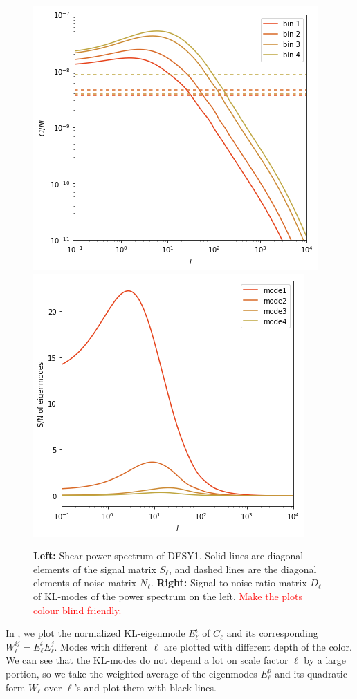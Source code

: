 \documentclass[twocolumn]{\docclass}
\begin{document}
	\begin{figure}
		\includegraphics[width=0.7\columnwidth]{Cl_pst.png}
		\qquad \qquad \qquad
		\includegraphics[width=0.7\columnwidth]{Dl_pst.png}
		\caption{\textbf{Left:} Shear power spectrum of DESY1. Solid lines are diagonal elements of the signal matrix $S_{\ell}$, and dashed lines are the diagonal elements of noise matrix $N_{\ell}$. \textbf{Right:} Signal to noise ratio matrix $D_\ell$ of KL-modes of the power spectrum on the left. \textcolor{red}{Make the plots colour blind friendly.} \label{fig:ClDl}}
	\end{figure}
	
	In , we plot the normalized KL-eigenmode $E_\ell^i$ of $C_{\ell}$ and its corresponding $W^{ij}_\ell=E_\ell^i E_\ell^j$. Modes with different $\ell$ are plotted with different depth of the color. We can see that the KL-modes do not depend a lot on scale factor $\ell$ by a large portion, so we take the weighted average of the eigenmodes $E_\ell^p$ and its quadratic form $W_\ell$ over $\ell$'s and plot them with black lines. 
	
\end{document}
